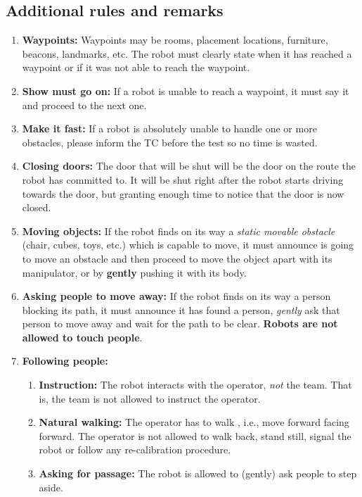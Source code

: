 \subsection{Additional rules and remarks}
\begin{enumerate}
	\item \textbf{Waypoints:} Waypoints may be rooms, placement locations, furniture, beacons, landmarks, etc. The robot must clearly state when it has reached a waypoint or if it was not able to reach the waypoint.

	\item \textbf{Show must go on:} If a robot is unable to reach a waypoint, it must say it and proceed to the next one.

	\item \textbf{Make it fast:} If a robot is absolutely unable to handle one or more obstacles, please inform the TC before the test so no time is wasted.

	\item \textbf{Closing doors:}  The door that will be shut will be the door on the route the robot has committed to. It will be shut right after the robot starts driving towards the door, but granting enough time to notice that the door is now closed.	

	\item \textbf{Moving objects:} If the robot finds on its way a \textit{static movable obstacle} (chair, cubes, toys, etc.) which is capable to move, it must announce is going to move an obstacle and then proceed to move the object apart with its manipulator, or by \textbf{gently} pushing it with its body.

	\item \textbf{Asking people to move away:} If the robot finds on its way a person blocking its path, it must announce it has found a person, \textit{gently} ask that person to move away and wait for the path to be clear. \textbf{Robots are not allowed to touch people}.

	\item \textbf{Following people:} 
	\begin{enumerate}
		\item \textbf{Instruction:} The robot interacts with the operator, \emph{not} the team. That is, the team is not allowed to instruct the operator.
		\item \textbf{Natural walking:} The operator has to walk , i.e., move forward facing forward. 
		  The operator is not allowed to walk back, stand still, signal the robot or follow any re-calibration procedure.
		\item \textbf{Asking for passage:} The robot is allowed to (gently) ask people to step aside.
	\end{enumerate}
	

\end{enumerate}
